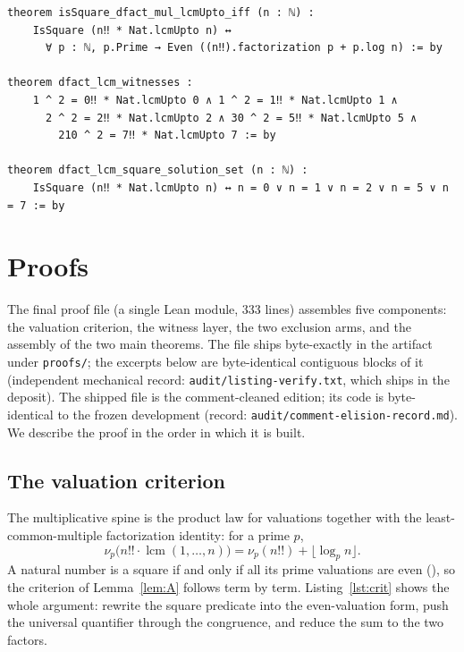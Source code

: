 \documentclass[11pt]{article}
\theoremstyle{definition}
\begin{document}
\begin{lstlisting}[caption={Frozen statement snapshot (Lean 4): the complete
frozen set, taken from the statement source shipped as
\texttt{proofs/dfact-lcm-square.statement.lean} (a comment-cleaned edition:
comments carrying pre-publication workflow narrative were blanked with line
numbers preserved; the statement text is byte-identical to the frozen snapshot
of record, sha256 \texttt{9baa672f}; correspondence record
\texttt{audit/comment-elision-record.md}).},label={lst:stmt}]
theorem isSquare_dfact_mul_lcmUpto_iff (n : ℕ) :
    IsSquare (n‼ * Nat.lcmUpto n) ↔
      ∀ p : ℕ, p.Prime → Even ((n‼).factorization p + p.log n) := by

theorem dfact_lcm_witnesses :
    1 ^ 2 = 0‼ * Nat.lcmUpto 0 ∧ 1 ^ 2 = 1‼ * Nat.lcmUpto 1 ∧
      2 ^ 2 = 2‼ * Nat.lcmUpto 2 ∧ 30 ^ 2 = 5‼ * Nat.lcmUpto 5 ∧
        210 ^ 2 = 7‼ * Nat.lcmUpto 7 := by

theorem dfact_lcm_square_solution_set (n : ℕ) :
    IsSquare (n‼ * Nat.lcmUpto n) ↔ n = 0 ∨ n = 1 ∨ n = 2 ∨ n = 5 ∨ n = 7 := by
\end{lstlisting}

\section{Proofs}\label{sec:proofs}

The final proof file (a single Lean module, 333 lines) assembles
five components: the valuation criterion, the witness layer, the two exclusion
arms, and the assembly of the two main theorems. The file ships byte-exactly
in the artifact under \texttt{proofs/}; the excerpts below are byte-identical
contiguous blocks of it (independent mechanical record:
\texttt{audit/listing-verify.txt}, which ships in the deposit). The shipped
file is the comment-cleaned edition; its code is byte-identical to the frozen
development (record: \texttt{audit/comment-elision-record.md}). We describe
the proof in the order in which it is built.

\subsection{The valuation criterion}

The multiplicative spine is the product law for valuations together with the
least-common-multiple factorization identity: for a prime $p$,
\[
\nu_p\bigl(n!! \cdot \operatorname{lcm}(1,\dots,n)\bigr)
  = \nu_p(n!!) + \lfloor \log_p n \rfloor .
\]
A natural number is a square if and only if all its prime valuations are even
(), so the criterion of
Lemma~\ref{lem:A} follows term by term. Listing~\ref{lst:crit} shows the whole
argument: rewrite the square predicate into the even-valuation form, push the
universal quantifier through the congruence, and reduce the sum to the two
factors.
\end{document}
